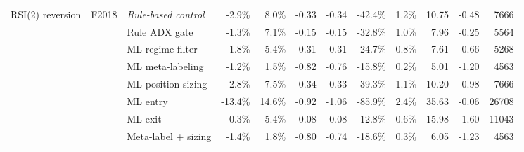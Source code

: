 \begin{longtable}{p{2.2cm} l p{2.6cm} r r r r r r r r r}
RSI(2) reversion & F2018 & \textit{Rule-based control} & -2.9\% & 8.0\% & -0.33 & -0.34 & -42.4\% & 1.2\% & 10.75 & -0.48 & 7666 \\
 &  & Rule ADX gate & -1.3\% & 7.1\% & -0.15 & -0.15 & -32.8\% & 1.0\% & 7.96 & -0.25 & 5564 \\
 &  & ML regime filter & -1.8\% & 5.4\% & -0.31 & -0.31 & -24.7\% & 0.8\% & 7.61 & -0.66 & 5268 \\
 &  & ML meta-labeling & -1.2\% & 1.5\% & -0.82 & -0.76 & -15.8\% & 0.2\% & 5.01 & -1.20 & 4563 \\
 &  & ML position sizing & -2.8\% & 7.5\% & -0.34 & -0.33 & -39.3\% & 1.1\% & 10.20 & -0.98 & 7666 \\
 &  & ML entry & -13.4\% & 14.6\% & -0.92 & -1.06 & -85.9\% & 2.4\% & 35.63 & -0.06 & 26708 \\
 &  & ML exit & 0.3\% & 5.4\% & 0.08 & 0.08 & -12.8\% & 0.6\% & 15.98 & 1.60 & 11043 \\
 &  & Meta-label + sizing & -1.4\% & 1.8\% & -0.80 & -0.74 & -18.6\% & 0.3\% & 6.05 & -1.23 & 4563 \\
\end{longtable}
